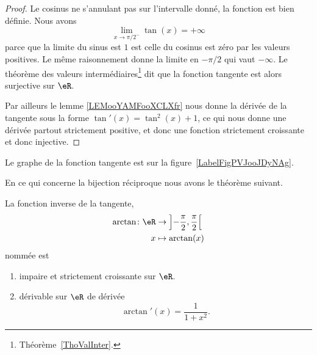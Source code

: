 	\begin{proof}
		Le cosinus ne s'annulant pas sur l'intervalle donné, la fonction est bien définie. Nous avons
		\begin{equation}
			\lim_{x\to \pi/2^-} \tan(x)=+\infty
		\end{equation}
		parce que la limite du sinus est \( 1\) est celle du cosinus est zéro par les valeurs positives. Le même raisonnement donne la limite en \( -\pi/2\) qui vaut \( -\infty\). Le théorème des valeurs intermédiaires\footnote{Théorème~\ref{ThoValInter}.} dit que la fonction tangente est alors surjective sur \( \eR\).

		Par ailleurs le lemme \ref{LEMooYAMFooXCLXfr} nous donne la dérivée de la tangente sous la forme $\tan'(x)=\tan^2(x)+1$, ce qui nous donne une dérivée partout strictement positive, et donc une fonction strictement croissante et donc injective.
	\end{proof}

	Le graphe de la fonction tangente est sur la figure~\ref{LabelFigPVJooJDyNAg}. %
	\newcommand{\CaptionFigPVJooJDyNAg}{Le graphe de la fonction tangente.}
	

	En ce qui concerne la bijection réciproque nous avons le théorème suivant.
	\begin{theorem}     \label{THOooUSVGooOAnCvC}
		La fonction inverse de la tangente,
		\begin{equation}
			\begin{aligned}
				\arctan\colon \eR & \to \left] -\frac{ \pi }{2} , \frac{ \pi }{2} \right[ \\
				x                 & \mapsto \arctan(x)
			\end{aligned}
		\end{equation}
		nommée  est
		\begin{enumerate}
			\item
			      impaire et strictement croissante sur \( \eR\).
			\item       \label{ITEMooMNHLooOVhIIb}
			      dérivable sur \( \eR\) de dérivée
			      \begin{equation}        \label{EQooGCHGooPlwYWt}
				      \arctan'(x)=\frac{1}{ 1+x^2 }.
			      \end{equation}
		\end{enumerate}
	\end{theorem}

